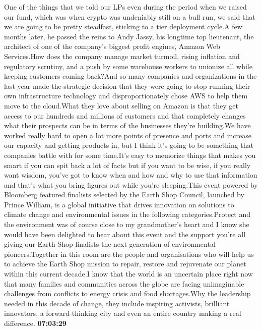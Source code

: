 \documentclass{article}%
\begin{document}
One of the things that we told our LPs even during the period when we raised our fund, which was when crypto was undeniably still on a bull run, we said that we are going to be pretty steadfast, sticking to a tier deployment cycle.A few months later, he passed the reins to Andy Jassy, his longtime top lieutenant, the architect of one of the company's biggest profit engines, Amazon Web Services.How does the company manage market turmoil, rising inflation and regulatory scrutiny, and a push by some warehouse workers to unionize all while keeping customers coming back?And so many companies and organizations in the last year made the strategic decision that they were going to stop running their own infrastructure technology and disproportionately chose AWS to help them move to the cloud.What they love about selling on Amazon is that they get access to our hundreds and millions of customers and that completely changes what their prospects can be in terms of the businesses they're building.We have worked really hard to open a lot more points of presence and ports and increase our capacity and getting products in, but I think it's going to be something that companies battle with for some time.It's easy to memorize things that makes you smart if you can spit back a lot of facts but if you want to be wise, if you really want wisdom, you've got to know when and how and why to use that information and that's what you bring figures out while you're sleeping.This event powered by Bloomberg featured finalists selected by the Earth Shop Council, launched by Prince William, is a global initiative that drives innovation on solutions to climate change and environmental issues in the following categories.Protect and the environment was of course close to my grandmother's heart and I know she would have been delighted to hear about this event and the support you're all giving our Earth Shop finalists the next generation of environmental pioneers.Together in this room are the people and organisations who will help us to achieve the Earth Shop mission to repair, restore and rejuvenate our planet within this current decade.I know that the world is an uncertain place right now that many families and communities across the globe are facing unimaginable challenges from conflicts to energy crisis and food shortages.Why the leadership needed in this decade of change, they include inspiring activists, brilliant innovators, a forward{-}thinking city and even an entire country making a real difference.%
\textbf{07:03:29}%
\newline%
\end{document}
